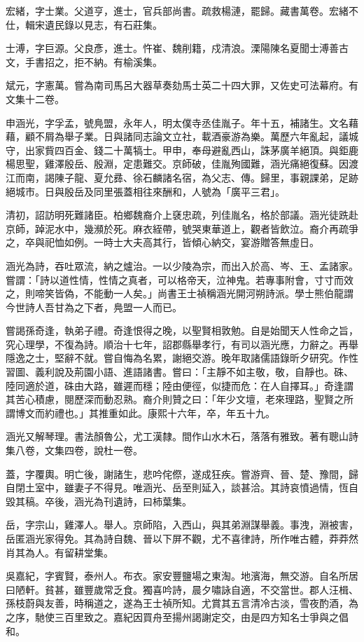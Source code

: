 \begin{pinyinscope}
宏緒，字士業。父道亨，進士，官兵部尚書。疏救楊漣，罷歸。藏書萬卷。宏緒不仕，輯宋遺民錄以見志，有石莊集。

士溥，字巨源。父良彥，進士。忤崔、魏削籍，戍清浪。溧陽陳名夏聞士溥善古文，手書招之，拒不納。有榆溪集。

斌元，字憲萬。嘗為南司馬呂大器草奏劾馬士英二十四大罪，又佐史可法幕府。有文集十二卷。

申涵光，字孚孟，號鳧盟，永年人，明太僕寺丞佳胤子。年十五，補諸生。文名藉藉，顧不屑為舉子業。日與諸同志論文立社，載酒豪游為樂。萬歷六年亂起，議城守，出家貲四百金、錢二十萬犒士。甲申，奉母避亂西山，誅茅廣羊絕頂。與鉅鹿楊思聖，雞澤殷岳、殷淵，定患難交。京師破，佳胤殉國難，涵光痛絕復蘇。因渡江而南，謁陳子龍、夏允彞、徐石麟諸名宿，為父志、傳。歸里，事親課弟，足跡絕城市。日與殷岳及同里張蓋相往來酬和，人號為「廣平三君」。

清初，詔訪明死難諸臣。柏鄉魏裔介上褎忠疏，列佳胤名，格於部議。涵光徒跣赴京師，踔泥水中，幾瀕於死。麻衣絰帶，號哭東華道上，觀者皆飲泣。裔介再疏爭之，卒與祀恤如例。一時士大夫高其行，皆傾心納交，宴游贈答無虛日。

涵光為詩，吞吐眾流，納之爐治。一以少陵為宗，而出入於高、岑、王、孟諸家。嘗謂：「詩以道性情，性情之真者，可以格帝天，泣神鬼。若專事附會，寸寸而效之，則啼笑皆偽，不能動一人矣。」尚書王士禎稱涵光開河朔詩派。學士熊伯龍謂今世詩人吾甘為之下者，鳧盟一人而已。

嘗謁孫奇逢，執弟子禮。奇逢恨得之晚，以聖賢相敦勉。自是始聞天人性命之旨，究心理學，不復為詩。順治十七年，詔郡縣舉孝行，有司以涵光應，力辭之。再舉隱逸之士，堅辭不就。嘗自悔為名累，謝絕交游。晚年取諸儒語錄昕夕研究。作性習圖、義利說及荊園小語、進語諸書。嘗曰：「主靜不如主敬，敬，自靜也。硃、陸同適於道，硃由大路，雖遲而穩；陸由便徑，似捷而危：在人自擇耳。」奇逢謂其苦心積慮，閱歷深而動忍熟。裔介則贊之曰：「年少文壇，老來理路，聖賢之所謂博文而約禮也。」其推重如此。康熙十六年，卒，年五十九。

涵光又解琴理。書法顏魯公，尤工漢隸。間作山水木石，落落有雅致。著有聰山詩集八卷，文集四卷，說杜一卷。

蓋，字覆輿。明亡後，謝諸生，悲吟侘傺，遂成狂疾。嘗游齊、晉、楚、豫間，歸自閉土室中，雖妻子不得見。唯涵光、岳至則延入，談甚洽。其詩哀憤過情，恆自毀其稿。卒後，涵光為刊遺詩，曰柿葉集。

岳，字宗山，雞澤人。舉人。京師陷，入西山，與其弟淵謀舉義。事洩，淵被害，岳匿涵光家得免。其為詩自魏、晉以下屏不觀，尤不喜律詩，所作唯古體，莽莽然肖其為人。有留耕堂集。

吳嘉紀，字賓賢，泰州人。布衣。家安豐鹽場之東淘。地濱海，無交游。自名所居曰陋軒。貧甚，雖豐歲常乏食。獨喜吟詩，晨夕嘯詠自適，不交當世。郡人汪楫、孫枝蔚與友善，時稱道之，遂為王士禎所知。尤賞其五言清冷古淡，雪夜酌酒，為之序，馳使三百里致之。嘉紀因買舟至揚州謁謝定交，由是四方知名士爭與之倡和。


\end{pinyinscope}
